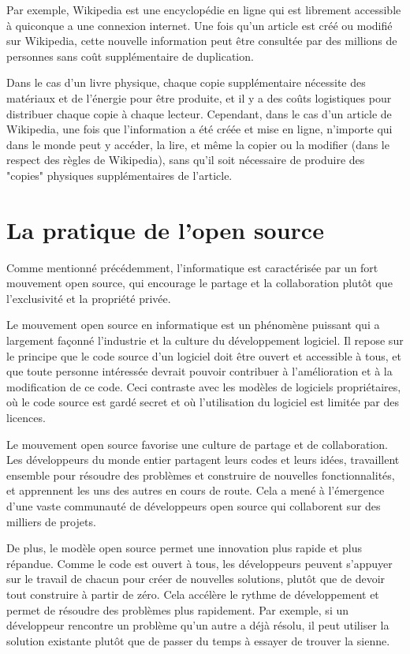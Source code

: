 Par exemple, Wikipedia est une encyclopédie en ligne qui est librement accessible à quiconque a une connexion internet. Une fois qu'un article est créé ou modifié sur Wikipedia, cette nouvelle information peut être consultée par des millions de personnes sans coût supplémentaire de duplication.

Dans le cas d'un livre physique, chaque copie supplémentaire nécessite des matériaux et de l'énergie pour être produite, et il y a des coûts logistiques pour distribuer chaque copie à chaque lecteur. Cependant, dans le cas d'un article de Wikipedia, une fois que l'information a été créée et mise en ligne, n'importe qui dans le monde peut y accéder, la lire, et même la copier ou la modifier (dans le respect des règles de Wikipedia), sans qu'il soit nécessaire de produire des "copies" physiques supplémentaires de l'article.


\section{La pratique de l'open source } 
Comme mentionné précédemment, l'informatique est caractérisée par un fort mouvement open source, qui encourage le partage et la collaboration plutôt que l'exclusivité et la propriété privée.

Le mouvement open source en informatique est un phénomène puissant qui a largement façonné l'industrie et la culture du développement logiciel. Il repose sur le principe que le code source d'un logiciel doit être ouvert et accessible à tous, et que toute personne intéressée devrait pouvoir contribuer à l'amélioration et à la modification de ce code. Ceci contraste avec les modèles de logiciels propriétaires, où le code source est gardé secret et où l'utilisation du logiciel est limitée par des licences.

Le mouvement open source favorise une culture de partage et de collaboration. Les développeurs du monde entier partagent leurs codes et leurs idées, travaillent ensemble pour résoudre des problèmes et construire de nouvelles fonctionnalités, et apprennent les uns des autres en cours de route. Cela a mené à l'émergence d'une vaste communauté de développeurs open source qui collaborent sur des milliers de projets.

De plus, le modèle open source permet une innovation plus rapide et plus répandue. Comme le code est ouvert à tous, les développeurs peuvent s'appuyer sur le travail de chacun pour créer de nouvelles solutions, plutôt que de devoir tout construire à partir de zéro. Cela accélère le rythme de développement et permet de résoudre des problèmes plus rapidement. Par exemple, si un développeur rencontre un problème qu'un autre a déjà résolu, il peut utiliser la solution existante plutôt que de passer du temps à essayer de trouver la sienne.

